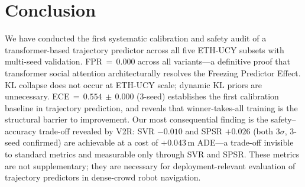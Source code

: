\documentclass[journal]{IEEEtran}
\begin{document}
\section{Conclusion}
\label{sec:conclusion}

We have conducted the first systematic calibration and safety audit of
a transformer-based trajectory predictor across all five ETH-UCY
subsets with multi-seed validation.
FPR\,\(=\,0.000\) across all variants---a definitive proof that
transformer social attention architecturally resolves the Freezing
Predictor Effect.
KL collapse does not occur at ETH-UCY scale; dynamic KL priors are
unnecessary.
ECE\,\(=\,0.554\,\pm\,0.000\) (3-seed) establishes the first
calibration baseline in trajectory prediction, and reveals that
winner-takes-all training is the structural barrier to improvement.
Our most consequential finding is the safety--accuracy trade-off
revealed by V2R: SVR $-0.010$ and SPSR $+0.026$ (both $3\sigma$,
3-seed confirmed) are achievable at a cost of $+0.043$\,m ADE---a
trade-off invisible to standard metrics and measurable only through
SVR and SPSR.
These metrics are not supplementary; they are necessary for
deployment-relevant evaluation of trajectory predictors in dense-crowd
robot navigation.



\end{document}
